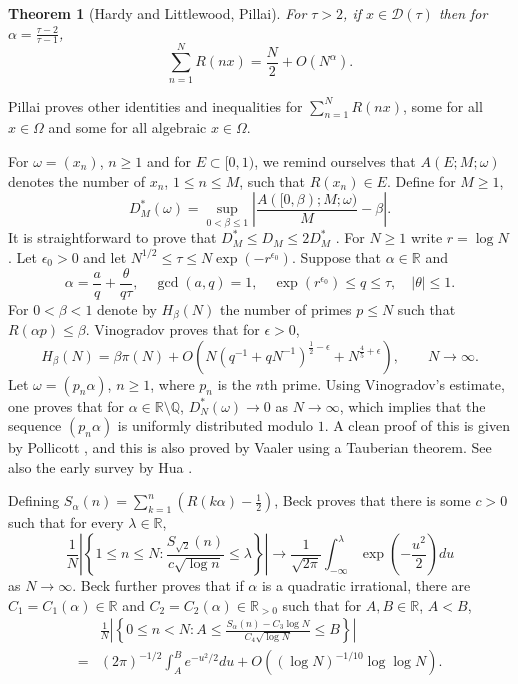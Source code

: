 \documentclass{article}
\newtheorem{theorem}{Theorem}
\begin{document}
\begin{theorem}[Hardy and Littlewood, Pillai]
For $\tau>2$, if $x \in \mathcal{D}(\tau)$ then for $\alpha = \frac{\tau-2}{\tau-1}$,
\[
\sum_{n=1}^N R(nx) = \frac{N}{2} + O(N^\alpha).
\]
\end{theorem}

Pillai \cite{pillai2} proves other identities and inequalities for  $\sum_{n=1}^N R(nx)$, some for all $x \in \Omega$ and some for all algebraic $x \in \Omega$. 



For $\omega=(x_n)$, $n \geq 1$ and for $E \subset [0,1)$, we remind ourselves that
$A(E;M;\omega)$ denotes the number of $x_n$, $1 \leq n \leq M$, such that $R(x_n) \in E$.
Define for $M \geq 1$,
\[
D_M^*(\omega) = \sup_{0<\beta \leq 1} \left| \frac{A([0,\beta);M;\omega)}{M}-\beta \right|.
\]
It is straightforward to prove that $D_M^* \leq D_M \leq 2D_M^*$ \cite[p.~91, Theorem 1.3]{kuipers}.
For $N \geq 1$ write $r=\log N$. Let $\epsilon_0>0$ and let
$N^{1/2} \leq \tau \leq N \exp(-r^{\epsilon_0})$. Suppose that $\alpha \in \mathbb{R}$ and 
\[
\alpha = \frac{a}{q} + \frac{\theta}{q\tau},\quad \gcd(a,q)=1,\quad \exp(r^{\epsilon_0}) \leq q \leq \tau,\quad |\theta| \leq 1.
\]
For $0<\beta<1$ denote by $H_\beta(N)$  the number of primes $p \leq N$ such that $R(\alpha p) \leq \beta$. 
Vinogradov \cite[p.~177, Chapter XI, Theorem]{vinogradov} proves that for $\epsilon>0$,
\[
H_\beta(N) = \beta \pi (N) + O(N(q^{-1}+qN^{-1})^{\frac{1}{2}-\epsilon} + N^{\frac{4}{5}+\epsilon}),
\qquad N \to \infty.
\]
Let $\omega=(p_n \alpha)$, $n \geq 1$, where $p_n$ is the $n$th prime. Using Vinogradov's estimate,
one proves that for $\alpha \in \mathbb{R} \setminus \mathbb{Q}$,
$D_N^*(\omega) \to 0$ as $N \to \infty$, which implies that the sequence $(p_n \alpha)$ is uniformly distributed modulo $1$.
A clean proof of this is given by Pollicott \cite[p.~200, Theorem 1]{pollicott},
and this is also
proved by Vaaler \cite{vaaler} using a Tauberian theorem. See also the early survey by 
Hua \cite[pp.~98--99, \S 38]{hua}.








Defining $S_\alpha(n)=\sum_{k=1}^n \left(R(k\alpha)-\frac{1}{2}\right)$, 
 Beck \cite[p.~14, Theorem 3.1]{beck} proves that there is some $c>0$ such that for every
 $\lambda \in \mathbb{R}$, 
 \[
 \frac{1}{N} \left| \left\{ 1 \leq n \leq N: \frac{S_{\sqrt{2}}(n)}{c\sqrt{\log n}} \leq \lambda 
 \right\} \right| \to \frac{1}{\sqrt{2\pi}} \int_{-\infty}^\lambda \exp\left(-\frac{u^2}{2}\right) du
 \]
 as $N \to \infty$. 
Beck \cite[p.~20, Theorem 1.2]{beck2014} further proves that if $\alpha$ is a quadratic irrational, there are
 $C_1=C_1(\alpha) \in \mathbb{R}$ and $C_2=C_2(\alpha) \in \mathbb{R}_{>0}$ such that for $A,B \in \mathbb{R}$, $A<B$,
\[
\begin{split}
&\frac{1}{N} \left| \left\{ 0 \leq n < N : A \leq \frac{S_\alpha(n)-C_3 \log N}{C_4 \sqrt{\log N}} \leq B\right\}\right|\\
=&(2\pi)^{-1/2} \int_A^B e^{-u^2/2} du + O((\log N)^{-1/10} \log \log N).
\end{split}
\]
\end{document}
